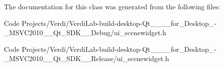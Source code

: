 \-The documentation for this class was generated from the following files\-:\begin{DoxyCompactItemize}
\item 
\-Code Projects/\-Verdi/\-Verdi\-Lab-\/build-\/desktop-\/\-Qt\-\_\-\_\-\_\-\_\-for\-\_\-\-Desktop\-\_\--\/\-\_\-\-M\-S\-V\-C2010\-\_\-\-\_\-\-Qt\-\_\-\-S\-D\-K\-\_\-\-\_\-\-Debug/ui\-\_\-scenewidget.\-h\item 
\-Code Projects/\-Verdi/\-Verdi\-Lab-\/build-\/desktop-\/\-Qt\-\_\-\_\-\_\-\_\-for\-\_\-\-Desktop\-\_\--\/\-\_\-\-M\-S\-V\-C2010\-\_\-\-\_\-\-Qt\-\_\-\-S\-D\-K\-\_\-\-\_\-\-Release/ui\-\_\-scenewidget.\-h\end{DoxyCompactItemize}
